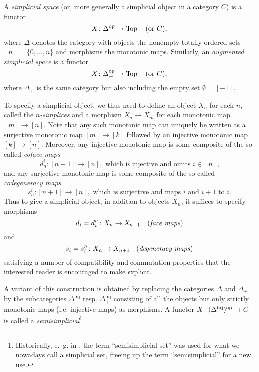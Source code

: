 \documentclass[a4paper,openany]{scrbook}
\begin{document}
\begin{defn}
A \emph{simplicial space} (or, more generally a simplicial object in a category $C$) is a functor
\[
X\colon \Delta^{\operatorname{op}} \to \operatorname{Top} \quad \text{(or $C$)},
\]
where $\Delta$ denotes the category with objects the nonempty totally ordered sets $[n] = \{0,\dots,n\}$ and morphisms the monotonic maps. Similarly, an \emph{augmented simplicial space} is a functor
\[
X\colon \Delta^{\operatorname{op}}_+ \to \operatorname{Top} \quad \text{(or $C$)},
\]
where $\Delta_+$ is the same category but also including the empty set $\emptyset = [-1]$.
\end{defn}

To specify a simplicial object, we thus need to define an object $X_n$ for each $n$, called the \emph{$n$-simplices} and a morphism $X_n \to X_m$ for each monotonic map $[m] \to [n]$. Note that any such monotonic map can uniquely be written as a surjective monotonic map $[m] \to [k]$ followed by an injective monotonic map $[k] \to [n]$. Moreover, any injective monotonic map is some composite of the so-called \emph{coface maps}
\[
d^i_n\colon [n-1] \to [n], \text{ which is injective and omits $i \in [n]$,}
\]
and any surjective monotonic map is some composite of the so-called \emph{codegeneracy maps}
\[
s^i_n\colon [n+1] \to [n], \text{ which is surjective and maps $i$ and $i+1$ to $i$.}
\]
Thus to give a simplicial object, in addition to objects $X_n$, it suffices to specify morphisms
\[
d_i=d_i^n\colon X_n \to X_{n-1} \quad \text{(\emph{face maps})}
\]
and
\[
s_i=s_i^n\colon X_n \to X_{n+1}\quad \text{(\emph{degeneracy maps})}
\]
satisfying a number of compatibility and commutation properties that the interested reader is encouraged to make explicit.

A variant of this construction is obtained by replacing the categories $\Delta$ and $\Delta_+$ by the subcategories $\Delta^{\operatorname{inj}}$ resp. $\Delta^{\operatorname{inj}}_+$ consisting of all the objects but only strictly monotonic maps (i.e. injective maps) as morphisms. A functor $X\colon (\Delta^{\operatorname{inj}})^{\operatorname{op}} \to C$ is called a \emph{semisimplicial}\footnote{Historically, e.~g. in \cite{milnor:57}, the term ``semisimplicial set'' was used for what we nowadays call a simplicial set, freeing up the term ``semisimplicial'' for a new use.}
\end{document}
